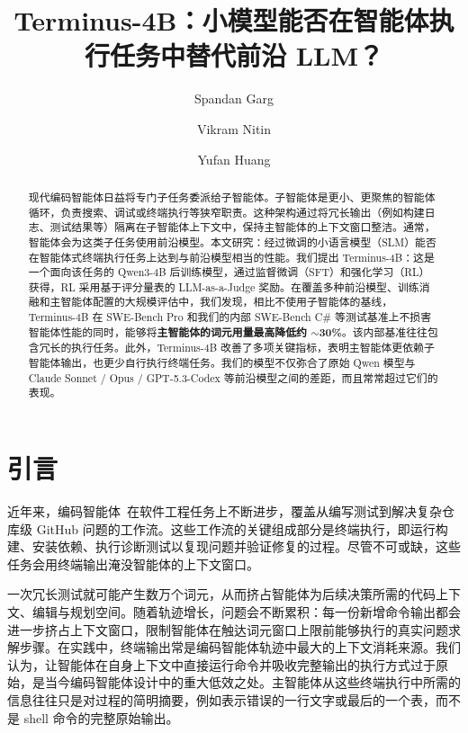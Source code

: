 \documentclass[sigconf,review]{acmart}
\begin{document}
\sloppy
\title[Terminus-4B]{Terminus-4B：小模型能否在智能体执行任务中替代前沿 LLM？}

\author{Spandan Garg}
\author{Vikram Nitin}
\author{Yufan Huang}

\date{}

\begin{abstract}
现代编码智能体日益将专门子任务委派给子智能体。子智能体是更小、更聚焦的智能体循环，负责搜索、调试或终端执行等狭窄职责。这种架构通过将冗长输出（例如构建日志、测试结果等）隔离在子智能体上下文中，保持主智能体的上下文窗口整洁。通常，智能体会为这类子任务使用前沿模型。本文研究：经过微调的小语言模型（SLM）能否在智能体式终端执行任务上达到与前沿模型相当的性能。我们提出 Terminus-4B：这是一个面向该任务的 Qwen3-4B 后训练模型，通过监督微调（SFT）和强化学习（RL）获得，RL 采用基于评分量表的 LLM-as-a-Judge 奖励。在覆盖多种前沿模型、训练消融和主智能体配置的大规模评估中，我们发现，相比不使用子智能体的基线，Terminus-4B 在 SWE-Bench Pro 和我们的内部 SWE-Bench C\# 等测试基准上不损害智能体性能的同时，能够将\textbf{主智能体的词元用量最高降低约 $\sim$30\%}。该内部基准往往包含冗长的执行任务。此外，Terminus-4B 改善了多项关键指标，表明主智能体更依赖子智能体输出，也更少自行执行终端任务。我们的模型不仅弥合了原始 Qwen 模型与 Claude Sonnet / Opus / GPT-5.3-Codex 等前沿模型之间的差距，而且常常超过它们的表现。
\end{abstract}

\maketitle

\thispagestyle{empty}
\pagestyle{plain}

\section{引言}
近年来，编码智能体~\cite{vscode_2025, wang2024opendevinopenplatformai, claude_code_2024, sweagent}在软件工程任务上不断进步，覆盖从编写测试到解决复杂仓库级 GitHub 问题的工作流。这些工作流的关键组成部分是终端执行，即运行构建、安装依赖、执行诊断测试以复现问题并验证修复的过程。尽管不可或缺，这些任务会用终端输出淹没智能体的上下文窗口。

一次冗长测试就可能产生数万个词元，从而挤占智能体为后续决策所需的代码上下文、编辑与规划空间。随着轨迹增长，问题会不断累积：每一份新增命令输出都会进一步挤占上下文窗口，限制智能体在触达词元窗口上限前能够执行的真实问题求解步骤。在实践中，终端输出常是编码智能体轨迹中最大的上下文消耗来源。我们认为，让智能体在自身上下文中直接运行命令并吸收完整输出的执行方式过于原始，是当今编码智能体设计中的重大低效之处。主智能体从这些终端执行中所需的信息往往只是对过程的简明摘要，例如表示错误的一行文字或最后的一个表，而不是 shell 命令的完整原始输出。
\end{document}
